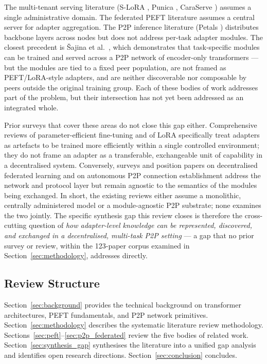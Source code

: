 The multi-tenant serving literature (S-LoRA \cite{Sheng2024}, Punica \cite{Chen2023Punica}, 
CaraServe \cite{Li2024CaraServe}) assumes a single administrative domain. 
The federated PEFT literature assumes a central server for adapter aggregation. 
The P2P inference literature (Petals \cite{Borzunov2023}) distributes backbone 
layers across nodes but does not address per-task adapter modules. The closest precedent is 
{\v{S}}ajina et al.~\cite{Sajina2024}, which demonstrates that task-specific modules can be trained and served 
across a P2P network of encoder-only transformers — but the modules are tied to a fixed peer 
population, are not framed as PEFT/LoRA-style adapters, and are neither discoverable nor composable 
by peers outside the original training group. Each of these bodies of work addresses part
of the problem, but their intersection has not yet been addressed as an integrated whole.

Prior surveys that cover these areas do not close this gap either. Comprehensive reviews of
parameter-efficient fine-tuning \cite{Han2024,WangAIReview2024} and of LoRA specifically
\cite{MaoLoraSurvey2024} treat adapters as artefacts to be trained more efficiently within a
single controlled environment; they do not frame an adapter as a transferable, exchangeable
unit of capability in a decentralised system. Conversely, surveys and position papers on
decentralised federated learning \cite{YeDecentralizedFL2022,WinkP2PFL2021} and on autonomous
P2P connection establishment \cite{SajinaP2PConnection2024} address the network and protocol
layer but remain agnostic to the semantics of the modules being exchanged. In short, the
existing reviews either assume a monolithic, centrally administered model or a module-agnostic
P2P substrate; none examines the two jointly. The specific synthesis gap this review closes is
therefore the cross-cutting question of \emph{how adapter-level knowledge can be represented,
discovered, and exchanged in a decentralised, multi-task P2P setting} --- a gap that no prior
survey or review, within the 123-paper corpus examined in
Section~\ref{sec:methodology}, addresses directly.

\subsection{Review Structure}
\label{sec:introduction:structure}

Section~\ref{sec:background} provides the technical background on transformer
architectures, PEFT fundamentals, and P2P network primitives. Section~\ref{sec:methodology}
describes the systematic literature review methodology. Sections~\ref{sec:peft}--\ref{sec:p2p_federated}
review the five bodies of related work. Section~\ref{sec:synthesis_gap} synthesises the
literature into a unified gap analysis and identifies open research directions.
Section~\ref{sec:conclusion} concludes.
